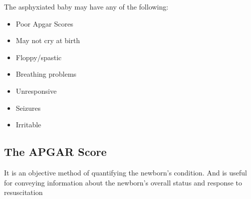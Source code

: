 \documentclass[
  letterpaper,
  DIV=11,
  numbers=noendperiod]{scrreprt}
\providecommand{\tightlist}{%
  \setlength{\itemsep}{0pt}\setlength{\parskip}{0pt}}\usepackage{longtable,booktabs,array}
\begin{document}
The asphyxiated baby may have any of the following:

\begin{itemize}
\tightlist
\item
  Poor Apgar Scores
\item
  May not cry at birth
\item
  Floppy/spastic
\item
  Breathing problems
\item
  Unresponsive
\item
  Seizures
\item
  Irritable
\end{itemize}

\hypertarget{the-apgar-score}{%
\subsection{The APGAR Score}\label{the-apgar-score}}

It is an objective method of quantifying the newborn's condition. And is
useful for conveying information about the newborn's overall status and
response to resuscitation
\end{document}
